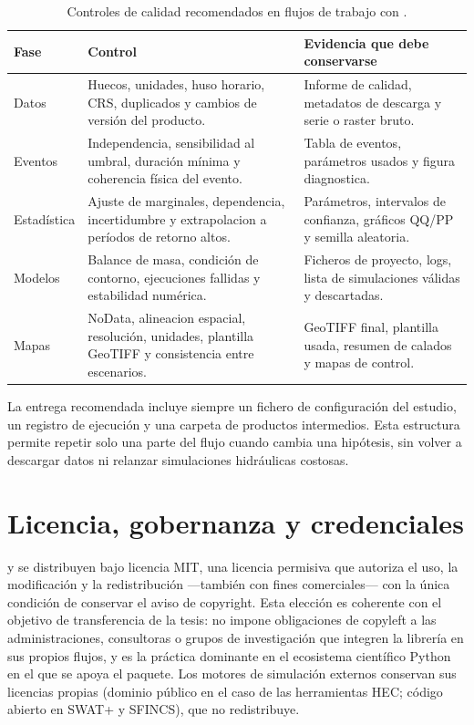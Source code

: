 \begin{table}[htbp]
  \centering
  \caption{Controles de calidad recomendados en flujos de trabajo con \hydra.}
  \label{tab:manual_qa}
  \begin{tabular}{p{}p{}p{}}
    \toprule
    Fase & Control & Evidencia que debe conservarse \\
    \midrule
    Datos & Huecos, unidades, huso horario, CRS, duplicados y cambios de versión del producto. & Informe de calidad, metadatos de descarga y serie o raster bruto. \\
    Eventos & Independencia, sensibilidad al umbral, duración mínima y coherencia física del evento. & Tabla de eventos, parámetros usados y figura diagnostica. \\
    Estadística & Ajuste de marginales, dependencia, incertidumbre y extrapolacion a períodos de retorno altos. & Parámetros, intervalos de confianza, gráficos QQ/PP y semilla aleatoria. \\
    Modelos & Balance de masa, condición de contorno, ejecuciones fallidas y estabilidad numérica. & Ficheros de proyecto, logs, lista de simulaciones válidas y descartadas. \\
    Mapas & NoData, alineacion espacial, resolución, unidades, plantilla GeoTIFF y consistencia entre escenarios. & GeoTIFF final, plantilla usada, resumen de calados y mapas de control. \\
    \bottomrule
  \end{tabular}
\end{table}

La entrega recomendada incluye siempre un fichero de configuración del estudio, un registro de ejecución y una carpeta de productos intermedios. Esta estructura permite repetir solo una parte del flujo cuando cambia una hipótesis, sin volver a descargar datos ni relanzar simulaciones hidráulicas costosas.

\section{Licencia, gobernanza y credenciales}
\label{sec:gobernanza}

\pyhydra y \hydra se distribuyen bajo licencia MIT, una licencia permisiva que autoriza el uso, la modificación y la redistribución ---también con fines comerciales--- con la única condición de conservar el aviso de copyright. Esta elección es coherente con el objetivo de transferencia de la tesis: no impone obligaciones de copyleft a las administraciones, consultoras o grupos de investigación que integren la librería en sus propios flujos, y es la práctica dominante en el ecosistema científico Python en el que se apoya el paquete. Los motores de simulación externos conservan sus licencias propias (dominio público en el caso de las herramientas HEC; código abierto en SWAT+ y SFINCS), que \hydra no redistribuye.

